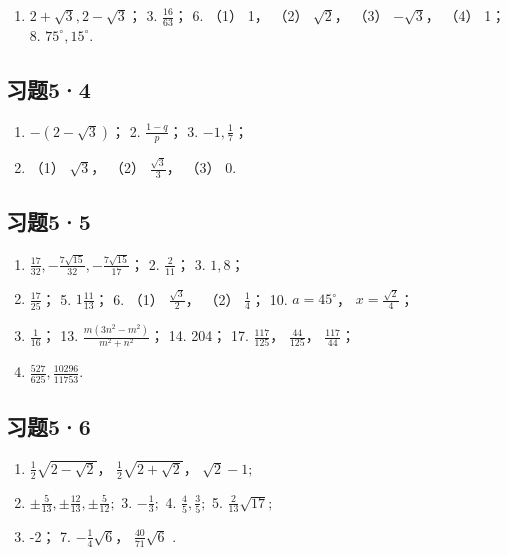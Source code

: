 \begin{enumerate}
\item
  \(2 + \sqrt{3}, 2 - \sqrt{3}\)； 3. \(\frac{16}{63}\)； 6. （1） 1，
  （2） \(\sqrt{2}\)， （3） \(-\sqrt{3}\)， （4） 1； 8.
  \(75^{\circ}, 15^{\circ}\).
\end{enumerate}

\subsection{习题5·4}

\begin{enumerate}
\item
  \(-(2 - \sqrt{3})\)； 2. \(\frac{1 - q}{p}\)； 3.
  \(-1, \frac{1}{7}\)；
\item
  （1） \(\sqrt{3}\)， （2） \(\frac{\sqrt{3}}{3}\)， （3） 0.
\end{enumerate}

\subsection{习题5·5}

\begin{enumerate}
\item
  \(\frac{17}{32}, -\frac{7\sqrt{15}}{32}, -\frac{7\sqrt{15}}{17}\)； 2.
  \(\frac{2}{11}\)； 3. \(1,8\)；
\item
  \(\frac{17}{25}\)； 5. \(1\frac{11}{13}\)； 6. （1）
  \(\frac{\sqrt{3}}{2}\)， （2） \(\frac{1}{4}\)； 10.
  \(a = 45^{\circ}\)， \(x = \frac{\sqrt{2}}{4}\)；
\item
  \(\frac{1}{16}\)； 13. \(\frac{m(3n^2 - m^2)}{m^2 + n^2}\)； 14. 204；
  17. \(\frac{117}{125}\)， \(\frac{44}{125}\)， \(\frac{117}{44}\)；
\item
  \(\frac{527}{625}, \frac{10296}{11753}\).
\end{enumerate}

\subsection{习题5·6}

\begin{enumerate}
\item
  \(\frac{1}{2}\sqrt{2 - \sqrt{2}}\)，
  \(\frac{1}{2}\sqrt{2 + \sqrt{2}}\)， \(\sqrt{2} -1;\)
\item
  \(\pm \frac{5}{13}, \pm \frac{12}{13}, \pm \frac{5}{12};\) 3.
  \(-\frac{1}{3};\) 4. \(\frac{4}{5}, \frac{3}{5};\) 5.
  \(\frac{2}{13}\sqrt{17};\)
\item
  -2； 7. \(-\frac{1}{4}\sqrt{6}\)， \(\frac{40}{71}\sqrt{6}\) .
\end{enumerate}

